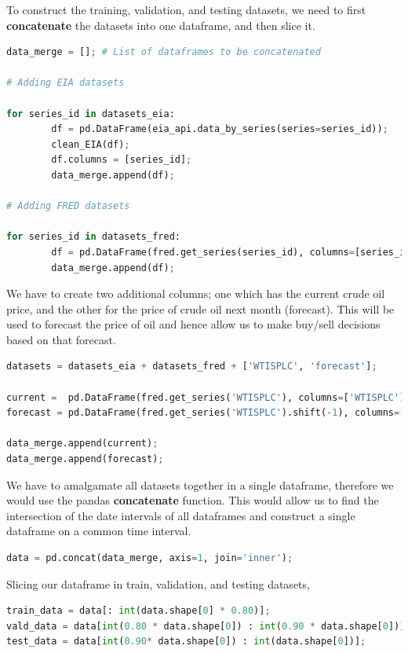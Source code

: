 To construct the training, validation, and testing datasets, we need to
first \textbf{concatenate} the datasets into one dataframe, and then
slice it.

\begin{lstlisting}[language=Python]
data_merge = []; # List of dataframes to be concatenated

# Adding EIA datasets 

for series_id in datasets_eia:
        df = pd.DataFrame(eia_api.data_by_series(series=series_id));
        clean_EIA(df);
        df.columns = [series_id];   
        data_merge.append(df);

# Adding FRED datasets 

for series_id in datasets_fred:
        df = pd.DataFrame(fred.get_series(series_id), columns=[series_id]);
        data_merge.append(df);
\end{lstlisting}

We have to create two additional columns; one which has the current
crude oil price, and the other for the price of crude oil next month
(forecast). This will be used to forecast the price of oil and hence
allow us to make buy/sell decisions based on that forecast.

\begin{lstlisting}[language=Python]
datasets = datasets_eia + datasets_fred + ['WTISPLC', 'forecast'];

current =  pd.DataFrame(fred.get_series('WTISPLC'), columns=['WTISPLC']);
forecast = pd.DataFrame(fred.get_series('WTISPLC').shift(-1), columns=['forecast']);

data_merge.append(current);
data_merge.append(forecast);
\end{lstlisting}

We have to amalgamate all datasets together in a single dataframe,
therefore we would use the pandas \textbf{concatenate} function. This
would allow us to find the intersection of the date intervals of all
dataframes and construct a single dataframe on a common time interval.

\begin{lstlisting}[language=Python]
data = pd.concat(data_merge, axis=1, join='inner');
\end{lstlisting}

Slicing our dataframe in train, validation, and testing datasets,

\begin{lstlisting}[language=Python]
train_data = data[: int(data.shape[0] * 0.80)];
vald_data = data[int(0.80 * data.shape[0]) : int(0.90 * data.shape[0])];
test_data = data[int(0.90* data.shape[0]) : int(data.shape[0])];
\end{lstlisting}

